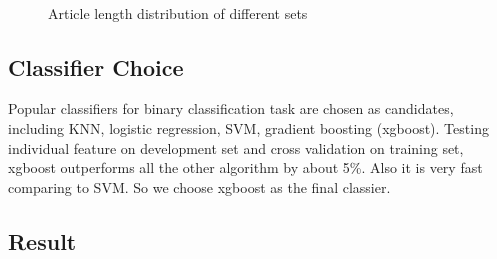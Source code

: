 \begin{figure}
\centering  
{}\hfill
{}\hfill
{}\\

\caption{Article length distribution of different sets}
\label{fig:040length}
\end{figure}

\subsection{Classifier Choice}
Popular classifiers for binary classification task are chosen as candidates, including KNN, logistic regression, SVM, gradient boosting (xgboost). Testing individual feature on development set and cross validation on training set, xgboost outperforms all the other algorithm by about 5\%. Also it is very fast comparing to SVM. So we choose xgboost as the final classier.

\subsection{Result}